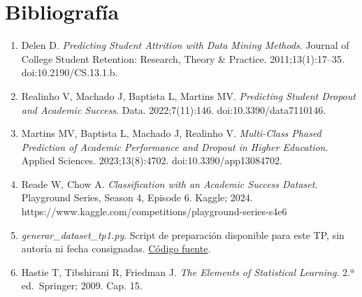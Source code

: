\documentclass[10pt,a4paper]{article}
\providecommand{\tightlist}{\setlength{\itemsep}{0pt}\setlength{\parskip}{0pt}}
\begin{document}
\hypertarget{bibliografuxeda}{%
\section{Bibliografía}\label{bibliografuxeda}}

\begin{enumerate}
\def\labelenumi{\arabic{enumi}.}
\tightlist
\item
  Delen D. \emph{Predicting Student Attrition with Data Mining Methods}. Journal of College Student Retention: Research, Theory \& Practice.
  2011;13(1):17--35. doi:10.2190/CS.13.1.b.
\item
  Realinho V, Machado J, Baptista L, Martins MV. \emph{Predicting Student Dropout and Academic Success}. Data. 2022;7(11):146.
  doi:10.3390/data7110146.
\item
  Martins MV, Baptista L, Machado J, Realinho V. \emph{Multi-Class Phased Prediction of Academic Performance and Dropout in Higher Education}. Applied
  Sciences. 2023;13(8):4702. doi:10.3390/app13084702.
\item
  Reade W, Chow A. \emph{Classification with an Academic Success Dataset}. Playground Series, Season 4, Episode 6. Kaggle; 2024.
  https://www.kaggle.com/competitions/playground-series-s4e6
\item
  \emph{generar\_dataset\_tp1.py}. Script de preparación disponible para este TP, sin autoría ni fecha consignadas.
  \href{../00_base_de_datos/generar_dataset_tp1.py}{Código fuente}.
\item
  Hastie T, Tibshirani R, Friedman J. \emph{The Elements of Statistical Learning}. 2.ª ed.~Springer; 2009. Cap. 15.
\end{enumerate}
\end{document}
